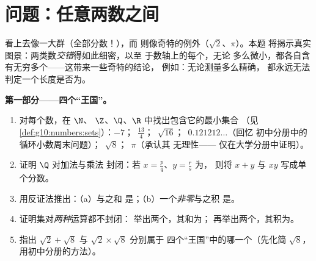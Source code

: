 \section{问题：任意两数之间}

\begin{problem}
\label{pb:g10:numbers:1}
看上去像一大群（全部分数！），而
则像奇特的例外（$\sqrt2$、$\pi$）。本题
将揭示真实图景：两类数\emph{交错}得如此细密，以至
于数轴上的每个，无论
多么微小，都各自含有无穷多个——这带来一些奇特的结论，
例如：无论测量多么精确，
都永远无法判定一个长度是否为。

\medskip
\noindent\textbf{第一部分——四个“王国”。}
\begin{enumerate}
  \item 对每个数，在 $\N$、
        $\Z$、$\Q$、$\R$ 中找出包含它的最小集合
        （见\cref{def:g10:numbers:sets}）：$-7$；\ $\frac{13}{4}$；\
        $\sqrt{16}$；\ $0.121212\ldots$（回忆
        初中分册中的循环小数周末问题）；\ $\sqrt8$；\ $\pi$（承认其
        无理性——
        仅在大学分册中证明）。
  \item 证明 $\Q$ 对加法与乘法
        封闭：若 $x = \frac pq$、$y = \frac rs$ 为，
        则将 $x + y$ 与 $xy$ 写成单个分数。
  \item 用反证法推出：（a）与之和
        是；（b）一个\emph{非零}与之积
        是。
  \item 证明集对\emph{两种}运算都不封闭：
        举出两个，其和为；
        再举出两个\omterm{ex:g10:numbers:classify}{无理数}，其积为\omterm{def:g10:numbers:sets}{有理数}。
  \item 指出 $\sqrt2 + \sqrt8$ 与 $\sqrt2 \times \sqrt8$ 分别属于
        四个“王国”中的哪一个（先化简 $\sqrt8$，
        用初中分册的方法）。
\end{enumerate}


\end{problem}
